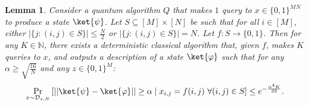 \documentclass[10pt,a4paper]{article}
\newtheorem{lemma}[theorem]{Lemma}
\newcommand{\Naturals}{\mathbb{N}}
\begin{document}
\begin{lemma}
\label{lem:sparse_aaronson_ambainis_single_query_2}
Consider a quantum algorithm $Q$ that makes $1$ query to $x \in \{0,1\}^{MN}$ to produce a state $\ket{\psi}$. Let $S \subseteq [M] \times [N]$ be such that for all $i \in [M]$, either $|\{j: (i, j) \in S\}| \le \frac{N}{2}$ or $|\{j: (i, j) \in S\}| = N$. Let $f: S \to \{0,1\}$. Then for any $K \in \Naturals$, there exists a deterministic classical algorithm that, given $f$, makes $K$ queries to $x$, and outputs a description of a state $\ket{\varphi}$ such that for any $\alpha \ge \sqrt{\frac{16}{N}}$ and any $z \in \{0,1\}^M$:
\[
\Pr_{x \sim \mathcal{D}_{z,N}} \left[|| \ket{\psi} - \ket{\varphi}|| \ge \alpha \mid x_{i,j} = f(i, j)\ \forall (i, j) \in S\right] \le e^{-\frac{\alpha^4 K}{32}}.
\]
\end{lemma}
\end{document}
